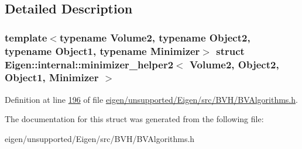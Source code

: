 \subsection{Detailed Description}
\subsubsection*{template$<$typename Volume2, typename Object2, typename Object1, typename Minimizer$>$\newline
struct Eigen\+::internal\+::minimizer\+\_\+helper2$<$ Volume2, Object2, Object1, Minimizer $>$}



Definition at line \hyperlink{eigen_2unsupported_2_eigen_2src_2_b_v_h_2_b_v_algorithms_8h_source_l00196}{196} of file \hyperlink{eigen_2unsupported_2_eigen_2src_2_b_v_h_2_b_v_algorithms_8h_source}{eigen/unsupported/\+Eigen/src/\+B\+V\+H/\+B\+V\+Algorithms.\+h}.



The documentation for this struct was generated from the following file\+:\begin{DoxyCompactItemize}
\item 
eigen/unsupported/\+Eigen/src/\+B\+V\+H/\+B\+V\+Algorithms.\+h\end{DoxyCompactItemize}
